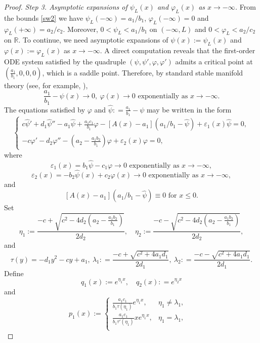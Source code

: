 \documentclass[reqno]{amsart}
\newcommand{\rev}[1]{#1}
\theoremstyle{plain}
\theoremstyle{definition}
\theoremstyle{remark}
\begin{document}
\begin{proof}
		\rev{\textit{Step 3. Asymptotic expansions of $\psi_L(x)$ and $\varphi_L(x)$ as $x \to -\infty$.}}
		\rev{From the bounds \eqref{sw2} we have $\psi_L(-\infty)=a_1/b_1$,
		$\varphi_L(-\infty)=0$ and $\varphi_L(+\infty)=a_2/c_2$. Moreover,
		$0<\psi_L<a_1/b_1$ on $(-\infty,L)$ and $0<\varphi_L<a_2/c_2$ on $\mathbb{R}$.}
		To continue, we need asymptotic expansions of \(\psi(x):=\psi_L(x)\) and \(\varphi(x):=\varphi_L(x)\) as \(x \to -\infty.\)		
		A direct computation reveals that the first-order ODE system satisfied by the quadruple $(\psi, \psi', \varphi, \varphi')$ admits a critical point at \((\frac{a_1}{b_1}, 0, 0, 0)\), which is a saddle point. Therefore, by standard stable manifold theory (see, for example, \cite[Theorem 4.1, Chapter 13]{MR69338}), 
		\[
		\frac{a_1}{b_1} - \psi(x) \to 0, ~ \varphi(x) \to 0 \text{ exponentially as } x \to -\infty. 
		\]
		The equations satisfied by \(\varphi\) and \( \hat{\psi} : = \frac{a_1}{b_1} - \psi\) may be written in the form
		\begin{equation}\label{sw3}
			\begin{cases}
				c \hat\psi ' + d_1 \hat\psi '' -a_1 \hat\psi + \frac{a_1c_1}{b_1} \varphi -[A(x) - a_1](a_1/b_1 - \hat\psi) + \varepsilon_1(x) \hat\psi= 0,\\
				-c \varphi ' - d_2 \varphi '' - (a_2 - \frac{a_1b_2}{b_1}) \varphi + \varepsilon_2(x) \varphi = 0,
			\end{cases}        
		\end{equation}
		where
		\[
		\varepsilon_1(x) = b_1 \hat\psi - c_1\varphi \to 0 \text{ exponentially as } x \to -\infty,
		\] 
		\[
		\varepsilon_2(x) = -b_2 \hat\psi(x) + c_2\varphi(x) \to 0 \text{ exponentially as } x \to -\infty,
		\]
		and
		\[
		[A(x) - a_1](a_1/b_1 - \hat\psi) \equiv 0 \text{ for } x \le 0.
		\]
		Set 
		\[
		\eta_1 := \frac{-c + \sqrt{c^2 -4d_2(a_2 - \frac{a_1b_2}{b_1})}}{2d_2},\quad \eta_2 := \frac{-c - \sqrt{c^2 -4d_2(a_2 - \frac{a_1b_2}{b_1})}}{2d_2},        
		\]
		and
		\[
		\tau(y) = -d_1y^2 - cy + a_1,~ \lambda_1 : = \frac{-c + \sqrt{c^2 + 4a_1d_1}}{2d_1}, ~ \lambda_2 : = \frac{-c - \sqrt{c^2 + 4a_1d_1}}{2d_1}.
		\]
		Define 
		\[
		q_1(x) := e^{\eta_1 x}, \quad q_2(x) : = e^{\eta_2 x}
		\]
		and
		\[
		p_1(x) := \begin{cases}
			\frac{a_1c_1}{b_1\tau(\eta_1)}e^{\eta_1 x}, &  \eta_1 \neq \lambda_1,\\
			\frac{a_1c_1}{b_1\tau'(\eta_1)}xe^{\eta_1 x}, &  \eta_1 = \lambda_1,\\
		\end{cases} \quad
\]
\end{proof}
\end{document}
